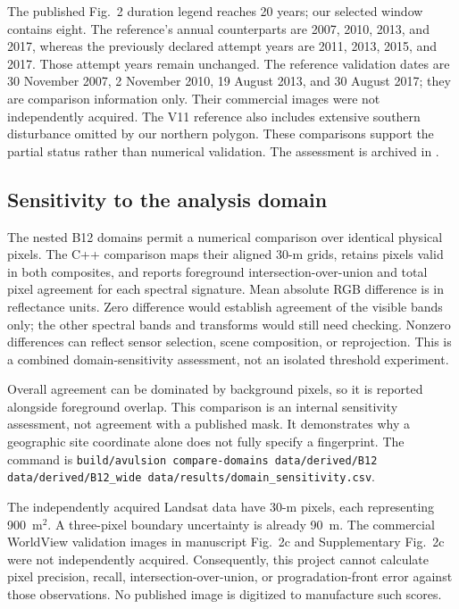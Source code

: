 \documentclass[11pt]{article}
\newcommand{\artifact}[1]{\path{#1}}
\begin{document}
The published Fig.~2 duration legend reaches 20 years; our selected window
contains eight. The reference's annual counterparts are 2007, 2010, 2013,
and 2017, whereas the previously declared attempt years are 2011, 2013, 2015,
and 2017. Those attempt years remain unchanged. The reference validation dates
are 30 November 2007, 2 November 2010, 19 August 2013, and 30 August 2017;
they are comparison information only. Their commercial images were not
independently acquired. The V11 reference also includes extensive southern
disturbance omitted by our northern polygon. These comparisons support the
partial status rather than numerical validation. The assessment is archived
in \artifact{docs/published-comparison.md}.

\subsection{Sensitivity to the analysis domain}
The nested B12 domains permit a numerical comparison over identical physical
pixels. The C++ comparison maps their aligned 30-m grids, retains pixels valid
in both composites, and reports foreground intersection-over-union and total
pixel agreement for each spectral signature. Mean absolute RGB difference is
in reflectance units. Zero difference would establish agreement of the visible
bands only; the other spectral bands and transforms would still need checking.
Nonzero differences can reflect sensor selection, scene composition, or
reprojection. This is a combined domain-sensitivity assessment, not an isolated
threshold experiment.

\begin{center}\small{}\end{center}
Overall agreement can be dominated by background pixels, so it is reported
alongside foreground overlap. This comparison is an internal sensitivity
assessment, not agreement with a published mask. It demonstrates why a
geographic site coordinate alone does not fully specify a fingerprint.
The command is
\texttt{build/avulsion compare-domains data/derived/B12
data/derived/B12\_wide data/results/domain\_sensitivity.csv}.

The independently acquired Landsat data have 30-m pixels, each representing
900~m$^2$. A three-pixel boundary uncertainty is already 90~m. The commercial
WorldView validation images in manuscript Fig.~2c and Supplementary Fig.~2c
were not independently acquired. Consequently, this project cannot calculate
pixel precision, recall, intersection-over-union, or progradation-front error
against those observations. No published image is digitized to manufacture
such scores.
\end{document}
